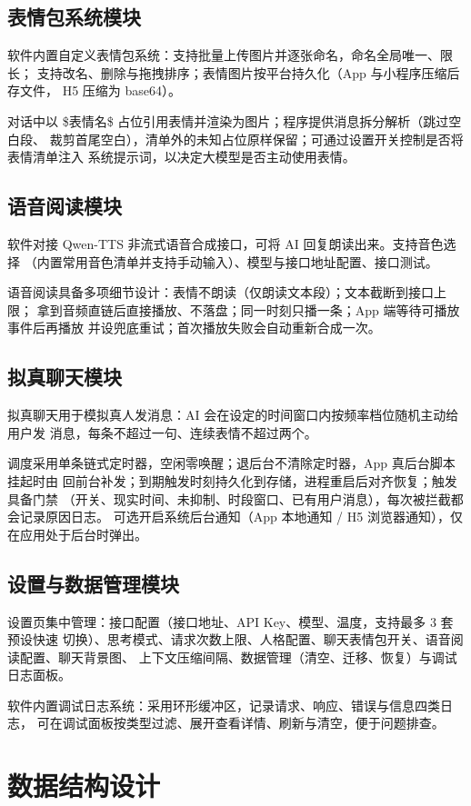 \documentclass[zihao=5,a4paper]{ctexart}
\begin{document}
\subsection{表情包系统模块}
软件内置自定义表情包系统：支持批量上传图片并逐张命名，命名全局唯一、限长；
支持改名、删除与拖拽排序；表情图片按平台持久化（App 与小程序压缩后存文件，
H5 压缩为 base64）。

对话中以 \$表情名\$ 占位引用表情并渲染为图片；程序提供消息拆分解析（跳过空白段、
裁剪首尾空白），清单外的未知占位原样保留；可通过设置开关控制是否将表情清单注入
系统提示词，以决定大模型是否主动使用表情。

\subsection{语音阅读模块}
软件对接 Qwen-TTS 非流式语音合成接口，可将 AI 回复朗读出来。支持音色选择
（内置常用音色清单并支持手动输入）、模型与接口地址配置、接口测试。

语音阅读具备多项细节设计：表情不朗读（仅朗读文本段）；文本截断到接口上限；
拿到音频直链后直接播放、不落盘；同一时刻只播一条；App 端等待可播放事件后再播放
并设兜底重试；首次播放失败会自动重新合成一次。

\subsection{拟真聊天模块}
拟真聊天用于模拟真人发消息：AI 会在设定的时间窗口内按频率档位随机主动给用户发
消息，每条不超过一句、连续表情不超过两个。

调度采用单条链式定时器，空闲零唤醒；退后台不清除定时器，App 真后台脚本挂起时由
回前台补发；到期触发时刻持久化到存储，进程重启后对齐恢复；触发具备门禁
（开关、现实时间、未抑制、时段窗口、已有用户消息），每次被拦截都会记录原因日志。
可选开启系统后台通知（App 本地通知 / H5 浏览器通知），仅在应用处于后台时弹出。

\subsection{设置与数据管理模块}
设置页集中管理：接口配置（接口地址、API Key、模型、温度，支持最多 3 套预设快速
切换）、思考模式、请求次数上限、人格配置、聊天表情包开关、语音阅读配置、聊天背景图、
上下文压缩间隔、数据管理（清空、迁移、恢复）与调试日志面板。

软件内置调试日志系统：采用环形缓冲区，记录请求、响应、错误与信息四类日志，
可在调试面板按类型过滤、展开查看详情、刷新与清空，便于问题排查。

\section{数据结构设计}
\end{document}
